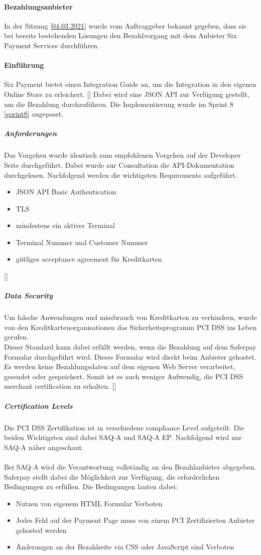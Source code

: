 \paragraph{Bezahlungsanbieter}
In der Sitzung \ref{04.03.2021} wurde vom Auftraggeber bekannt gegeben, dass sie bei bereits bestehenden Lösungen den Bezahlvorgang mit dem Anbieter Six Payment Services durchführen. 

\paragraph{Einführung}
Six Payment bietet einen Integration Guide an, um die Integration in den eigenen Online Store zu erleichert. [\cite{sixECommerce}] Dabei wird eine JSON API zur Verfügung gestellt, um die Bezahlung durchzuführen. 
Die Implementierung wurde im Sprint 8 \ref{sprint8} angepasst. 
\subparagraph{Anforderungen}
Das Vorgehen wurde identisch zum empfohlenen Vorgehen auf der Developer Seite durchgeführt. Dabei wurde zur Consultation die API-Dokumentation durchgelesen. Nachfolgend werden die wichtigsten Requirements aufgeführt. 
\begin{itemize}
	\item JSON API Basic Authentication
	\item TLS 
	\item mindestens ein aktiver Terminal
	\item Terminal Nummer und Customer Nummer
	\item gütliges acceptance agreement für Kreditkarten
\end{itemize} 
[\cite{jsonAPISix}]
\subparagraph{Data Security}
Um falsche Anwendungen und missbrauch von Kreditkarten zu verhindern, wurde von den Kreditkartenorganisationen das Sicherheitsprogramm \ac{PCI DSS} ins Leben gerufen. \\
Dieser Standard kann dabei erfüllt werden, wenn die Bezahlung auf dem Saferpay Formular durchgeführt wird. Dieses Formular wird direkt beim Anbieter gehostet. Es werden keine Bezahlungsdaten auf dem eigenen Web Server verarbeitet, gesendet oder gespeichert. Somit ist es auch weniger Aufwendig, die PCI DSS merchant certification zu erhalten. [\cite{jsonAPISix}]

\subparagraph{Certification Levels}
Die \ac{PCI DSS} Zertifikation ist in verschiedene compliance Level aufgeteilt. Die beiden Wichtigsten sind dabei \ac{SAQ}-A und \ac{SAQ}-A EP. Nachfolgend wird nur \ac{SAQ}-A näher angeschaut. \\\\
Bei \ac{SAQ}-A wird die Verantwortung vollständig an den Bezahlanbieter abgegeben. Saferpay stellt dabei die Möglichkeit zur Verfügung, die erforderlichen Bedingungen zu erfüllen. Die Bedingungen lauten dabei: 
\begin{itemize}
	\item Nutzen von eigenem HTML Formular Verboten
	\item Jedes Feld auf der Payment Page muss von einem PCI Zertifizierten Anbieter gehosted werden
	\item Änderungen an der Bezahlseite via CSS oder JavaScript sind Verboten
\end{itemize}

